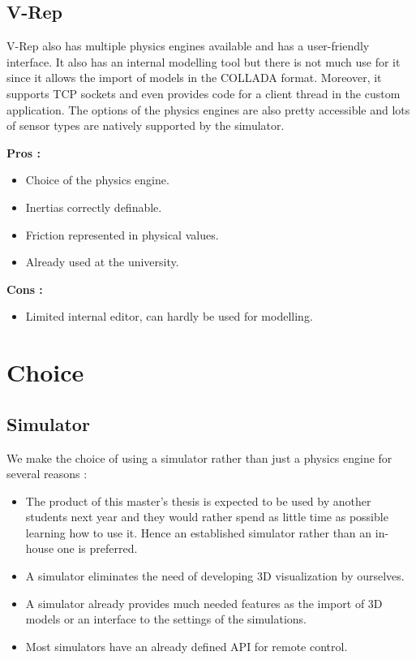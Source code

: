 \subsection{V-Rep}
V-Rep also has multiple physics engines available and has a user-friendly interface. It also has an internal modelling tool but there is not much use for it since it allows the import of models in the COLLADA format. Moreover, it supports TCP sockets and even provides code for a client thread in the custom application. The options of the physics engines are also pretty accessible and lots of sensor types are natively supported by the simulator.

\textbf{Pros :}
\begin{itemize}
\item Choice of the physics engine.
\item Inertias correctly definable.
\item Friction represented in physical values.
\item Already used at the university.
\end{itemize}

\textbf{Cons :}
\begin{itemize}
\item Limited internal editor, can hardly be used for modelling.
\end{itemize}

\section{Choice}
\subsection{Simulator}
We make the choice of using a simulator rather than just a physics engine for several reasons :\begin{itemize}
\item The product of this master's thesis is expected to be used by another students next year and they would rather spend as little time as possible learning how to use it. Hence an established simulator rather than an in-house one is preferred.
\item A simulator eliminates the need of developing 3D visualization by ourselves.
\item A simulator already provides much needed features as the import of 3D models or an interface to the settings of the simulations.
\item Most simulators have an already defined API for remote control.
\end{itemize}

